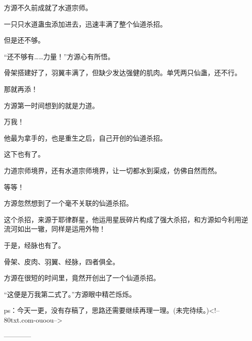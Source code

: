 \begin{this_body}
方源不久前成就了水道宗师。

一只只水道蛊虫添加进去，迅速丰满了整个仙道杀招。

但是还不够。

“还不够有……力量！”方源心有所悟。

骨架搭建好了，羽翼丰满了，但缺少发达强健的肌肉。单凭两只仙蛊，还不行。

那就再添！

方源第一时间想到的就是力道。

万我！

他最为拿手的，也是重生之后，自己开创的仙道杀招。

这下也有了。

力道宗师境界，还有水道宗师境界，让一切都水到渠成，仿佛自然而然。

等等！

方源忽然想到了一个毫不关联的仙道杀招。

这个杀招，来源于耶律群星，他运用星辰碎片构成了强大杀招，和方源如今利用逆流河如出一辙，同样是运用外物！

于是，经脉也有了。

骨架、皮肉、羽翼、经脉，四者俱全。

方源在很短的时间里，竟然开创出了一个仙道杀招。

“这便是万我第二式了。”方源眼中精芒烁烁。

ps：今天一更，没有存稿了，思路还需要继续再理一理。(未完待续。)<!--80txt.com-ouoou-->

------------

\end{this_body}

